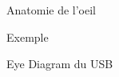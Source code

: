 \begin{frame}{Anatomie de l'oeil}
    \begin{center}
    \end{center}
\end{frame}

\begin{frame}{Exemple}
    \begin{center}
    \end{center}
\end{frame}

\begin{frame}{Eye Diagram du USB}
    \begin{center}
    \end{center}
\end{frame}
